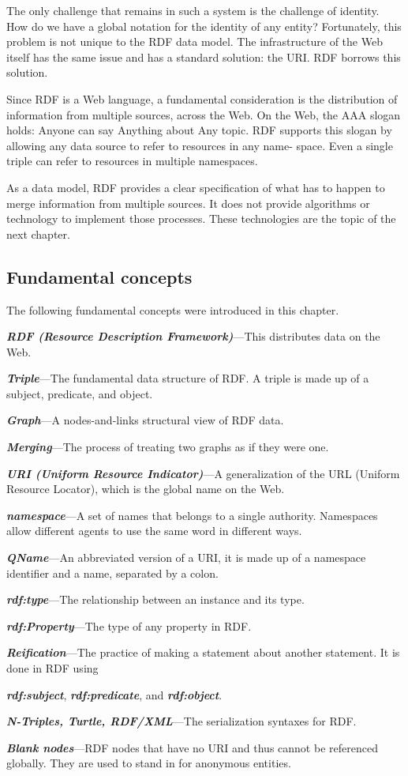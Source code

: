 The only challenge that remains in such a system is the challenge of
identity. How do we have a global notation for the identity of any
entity? Fortunately, this problem is not unique to the RDF data model.
The infrastructure of the Web itself has the same issue and has a
standard solution: the URI. RDF borrows this solution.

Since RDF is a Web language, a fundamental consideration is the
distribution of information from multiple sources, across the Web. On
the Web, the AAA slogan holds: Anyone can say Anything about Any topic.
RDF supports this slogan by allowing any data source to refer to
resources in any name- space. Even a single triple can refer to
resources in multiple namespaces.

As a data model, RDF provides a clear specification of what has to
happen to merge information from multiple sources. It does not provide
algorithms or technology to implement those processes. These
technologies are the topic of the next chapter.

\subsection{Fundamental concepts}

The following fundamental concepts were introduced in this chapter.

\emph{\textbf{RDF (Resource Description Framework)}}---This distributes
data on the Web.

\emph{\textbf{Triple}}---The fundamental data structure of RDF. A triple
is made up of a subject, predicate, and object.

\emph{\textbf{Graph}}---A nodes-and-links structural view of RDF data.

\emph{\textbf{Merging}}---The process of treating two graphs as if they
were one.

\emph{\textbf{URI (Uniform Resource Indicator)}}---A generalization of
the URL (Uniform Resource Locator), which is the global name on the Web.

\emph{\textbf{namespace}}---A set of names that belongs to a single authority.
Namespaces allow different agents to use the same word in different
ways.

\emph{\textbf{QName}}---An abbreviated version of a URI, it is made up of a
namespace identifier and a name, separated by a colon.

\emph{\textbf{rdf:type}}---The relationship between an instance and its type.

\emph{\textbf{rdf:Property}}---The type of any property in RDF.

\emph{\textbf{Reification}}---The practice of making a statement about another
statement. It is done in RDF using

\emph{\textbf{rdf:subject}}, \emph{\textbf{rdf:predicate}}, and \emph{\textbf{rdf:object}}.

\emph{\textbf{N-Triples, Turtle, RDF/XML}}---The serialization syntaxes for
RDF.

\emph{\textbf{Blank nodes}}---RDF nodes that have no URI and thus cannot be
referenced globally. They are used to stand in for anonymous entities.
